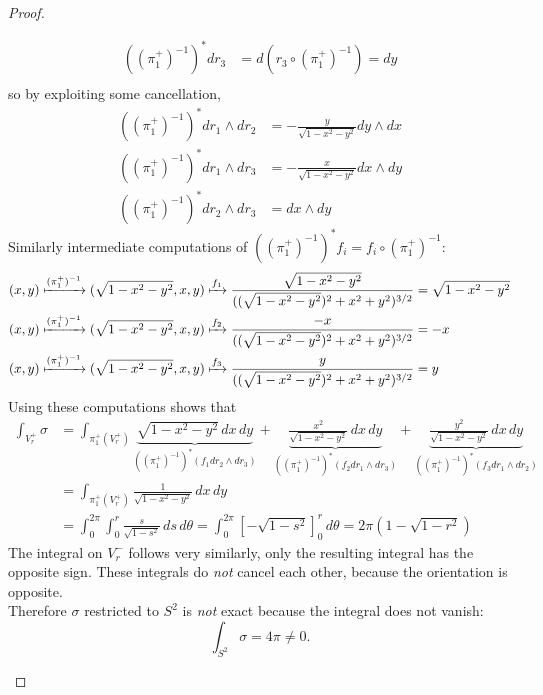 \documentclass{article}
\begin{document}
\begin{proof}
\begin{enumerate}[(a)]
\begin{align*}
      ((\pi_1^+)^{-1})^* dr_3 &= d(r_3 \circ (\pi_1^+)^{-1}) = dy\\
    \end{align*} so by exploiting some cancellation, \begin{align*}
      ((\pi_1^+)^{-1})^* dr_1 \wedge dr_2 &= -\frac{y}{\sqrt{1 - x^2 - y^2}}dy \wedge dx\\
      ((\pi_1^+)^{-1})^* dr_1 \wedge dr_3 &= -\frac{x}{\sqrt{1 - x^2 - y^2}}dx \wedge dy \\
      ((\pi_1^+)^{-1})^* dr_2 \wedge dr_3 &= dx \wedge dy
    \end{align*}
    Similarly intermediate computations of
    $((\pi_1^+)^{-1})^* f_i = f_i \circ (\pi_1^+)^{-1}$: \begin{align*}
      (x, y) &\xmapsto{(\pi_1^+)^{-1}} (\sqrt{1 - x^2 - y^2}, x, y) \xmapsto{f_1} \frac{\sqrt{1 - x^2 - y^2}}{((\sqrt{1 - x^2 - y^2})^2 + x^2 + y^2)^{3/2}} = \sqrt{1 - x^2 - y^2}\\
      (x, y) &\xmapsto{(\pi_1^+)^{-1}} (\sqrt{1 - x^2 - y^2}, x, y) \xmapsto{f_2} \frac{-x}{((\sqrt{1 - x^2 - y^2})^2 + x^2 + y^2)^{3/2}} = -x \\
      (x, y) &\xmapsto{(\pi_1^+)^{-1}} (\sqrt{1 - x^2 - y^2}, x, y) \xmapsto{f_3} \frac{y}{((\sqrt{1 - x^2 - y^2})^2 + x^2 + y^2)^{3/2}} = y \\
    \end{align*}
    Using these computations shows that \begin{align*}
      \int_{V_r^+} \sigma
      &= \int_{\pi_1^+(V_r^+)} \underbrace{\sqrt{1 - x^2 - y^2}\, dx\, dy}_{
          ((\pi_1^+)^{-1})^* (f_1 dr_2 \wedge dr_3)
        }
        + \underbrace{\frac{x^2}{\sqrt{1 - x^2 - y^2}}\,dx\, dy}_{
            ((\pi_1^+)^{-1})^* (f_2 dr_1 \wedge dr_3)
          }
        + \underbrace{\frac{y^2}{\sqrt{1 - x^2 - y^2}}\, dx\, dy}_{
            ((\pi_1^+)^{-1})^* (f_3 dr_1 \wedge dr_2)
          }\\
      &= \int_{\pi_1^+(V_r^+)} \frac{1}{\sqrt{1 - x^2 - y^2}}\,dx\,dy \\
      &= \int_0^{2\pi}\int_0^r \frac{s}{\sqrt{1 - s^2}}\,ds\,d\theta
      = \int_0^{2\pi}\left[-\sqrt{1 - s^2}\right]_0^r\,d\theta
      = 2\pi (1-\sqrt{1 - r^2})
    \end{align*}
    The integral on $V_r^-$ follows very similarly, only the resulting integral
    has the opposite sign. These integrals do \textit{not} cancel each other,
    because the orientation is opposite.\\
    Therefore $\sigma$ restricted to $S^2$ is \textit{not} exact because the
    integral does not vanish: \[
      \int_{S^2} \sigma = 4\pi \neq 0.
    \]
  \end{enumerate}
\end{proof}
\pagebreak
\end{document}
